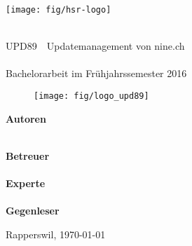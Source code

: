 
\author{
	\ubos \\
	\and
	\pchr \\
}

\clearpage
\begin{titlepage}
	\begin{minipage}{0.4\textwidth}
		\texttt{[image: fig/hsr-logo]}
	\end{minipage}
	\hfill

	\begin{center}
		\hr{1pt} \\[0.2cm]
		\huge UPD89\ \textendash \ Updatemanagement von nine.ch \\
		\hr{1pt} \\[0.2cm]
		\Large{Bachelorarbeit im Frühjahrssemester 2016} \\ [25pt]
		\begin{figure}[H]
			\centering
			\texttt{[image: fig/logo\_upd89]}
		\end{figure}
		\vfill
	\end{center}

	\begin{minipage}{\linewidth}
	\begin{minipage}[t]{0.33\linewidth}
		\Large \textbf{Autoren} \\
		\Large \ubos \\
		\Large \pchr
	\end{minipage}
	\hfill\begin{minipage}[t]{0.5\linewidth}
		\Large \textbf{Betreuer} \\
		\Large \proff \\
		\textbf{\Large Experte}\\
		\Large \examm \\
		\textbf{\Large Gegenleser}\\
		\Large \msto
	\end{minipage}
	\end{minipage}

	\begin{minipage}{0.33\linewidth}

	\end{minipage}
	\begin{minipage}{0.33\linewidth}


	\end{minipage}
	\begin{minipage}{0.33\linewidth}

	\end{minipage}
	\vfill
	\Large Rapperswil, \today

\end{titlepage}

\restoregeometry
